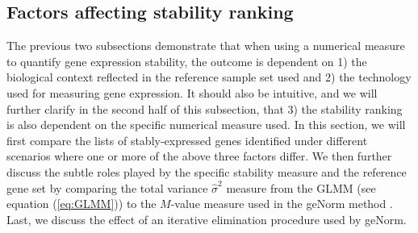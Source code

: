 \documentclass[letterpaper,12pt]{article}
\begin{document}
\subsection{Factors affecting stability ranking}\label{section:stabilityMeasure}
The previous two subsections demonstrate that when using a numerical measure
to quantify gene expression stability, the outcome is dependent on 1) the
biological context reflected in the reference sample set used and 2) the
technology used for measuring gene expression. It should also be intuitive,
and we will further clarify in the second half of this subsection, that 3) the
stability ranking is also dependent on the specific numerical measure used.
In this section, we will first compare the lists of stably-expressed genes
identified under different scenarios where one or more of the above three
factors differ.  We then further discuss the subtle roles played by the
specific stability measure and the reference gene set by comparing the total
variance $\hat\sigma^2$ measure from the GLMM (see equation (\ref{eq:GLMM}))
to the $M$-value measure used in the geNorm method \citep{vandesompele2002accurate}.
Last, we discuss the effect of an iterative elimination procedure used by
geNorm.
\end{document}
